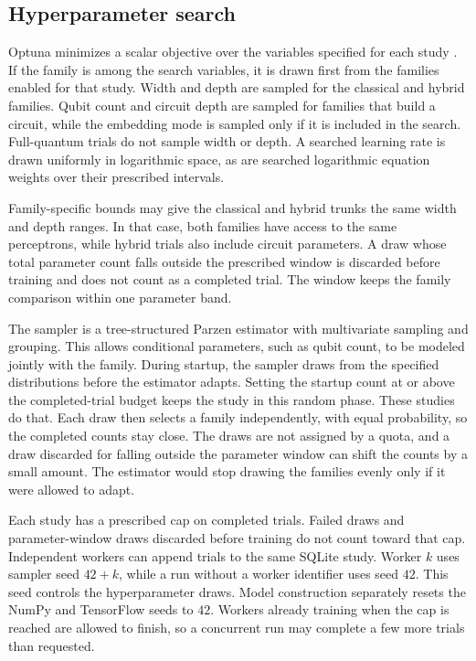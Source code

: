 \documentclass{erdc}
\begin{document}
\subsection{Hyperparameter search}
\label{sec:search}

Optuna minimizes a scalar objective over the variables specified for
each study \cite{akiba2019optuna}. If the family is among the search
variables, it is drawn first from the families enabled for that study.
Width and depth are sampled for the classical and hybrid families.
Qubit count and circuit depth are sampled for families that build a
circuit, while the embedding mode is sampled only if it is included in
the search. Full-quantum trials do not sample width or depth. A searched
learning rate is drawn uniformly in logarithmic space, as are searched
logarithmic equation weights over their prescribed intervals.

Family-specific bounds may give the classical and hybrid trunks the
same width and depth ranges. In that case, both families have access to
the same perceptrons, while hybrid trials also include circuit
parameters. A draw whose total parameter count falls outside the
prescribed window is discarded before training and does not count as a
completed trial. The window keeps the family comparison within one
parameter band.

The sampler is a tree-structured Parzen estimator with multivariate
sampling and grouping. This allows conditional parameters, such as
qubit count, to be modeled jointly with the family. During startup, the
sampler draws from the specified distributions before the estimator
adapts. Setting the startup count at or above the completed-trial
budget keeps the study in this random phase. These studies do that.
Each draw then selects a family independently, with equal probability,
so the completed counts stay close. The draws are not assigned by a
quota, and a draw discarded for falling outside the parameter window
can shift the counts by a small amount. The estimator would stop
drawing the families evenly only if it were allowed to adapt.

Each study has a prescribed cap on completed trials. Failed draws and
parameter-window draws discarded before training do not count toward
that cap. Independent workers can append trials to the same SQLite
study. Worker \(k\) uses sampler seed \(42+k\), while a run without a
worker identifier uses seed \(42\). This seed controls the
hyperparameter draws. Model construction separately resets the NumPy
and TensorFlow seeds to \(42\). Workers already training when the cap
is reached are allowed to finish, so a concurrent run may complete a
few more trials than requested.
\end{document}

